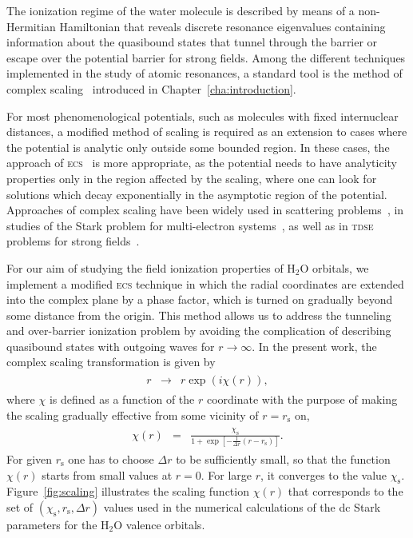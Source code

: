 The ionization regime of the water molecule is described by means of a
non-Hermitian Hamiltonian that reveals discrete resonance eigenvalues
containing information about the quasibound states that tunnel through
the barrier or escape over the potential barrier for strong
fields. Among the different techniques implemented in the study of
atomic resonances, a standard tool is the method of complex
scaling~\cite{complexScaling,complexScalingBaslev,complexScalingSimon}
introduced in Chapter~\ref{cha:introduction}.

For most phenomenological potentials, such as molecules with fixed
internuclear distances, a modified method of scaling is required as an
extension to cases where the potential is analytic only outside some
bounded region. In these cases, the approach of
\textsc{ecs}~\cite{Simon_1979} is more appropriate, as the potential
needs to have analyticity properties only in the region affected by
the scaling, where one can look for solutions which decay
exponentially in the asymptotic region of the potential. Approaches of
complex scaling have been widely used in scattering
problems~\cite{complexScalingBaslev, complexScalingSimon}, in studies
of the Stark problem for multi-electron
systems~\cite{ScrinziJChemPhys_ECS,ScrinziJPhysB_ECS}, as well as in
\textsc{tdse} problems for strong fields~\cite{ecsRuiz, ecsTao,
  ecsScrinzi}.

For our aim of studying the field ionization properties of H$_{2}$O
orbitals, we implement a modified \textsc{ecs} technique in which the
radial coordinates are extended into the complex plane by a phase
factor, which is turned on gradually beyond some distance from the
origin. This method allows us to address the tunneling and
over-barrier ionization problem by avoiding the complication of
describing quasibound states with outgoing waves for $r \to
\infty$. In the present work, the complex scaling transformation is
given by
%
\begin{eqnarray}
  \begin{split}
    r & \rightarrow & r\exp(i\chi(r)),
  \end{split}
\label{eq:ecs_r}
\end{eqnarray}
%
where $\chi$ is defined as a function of the $r$ coordinate with the
purpose of making the scaling gradually effective from some vicinity
of $r = r_{\mathrm{s}}$ on,
%
\begin{eqnarray}
  \begin{split}
    \chi(r) & = & \frac{\chi_{\mathrm{s}}}{1+\exp[-\frac{1}{\Delta r}
        (r - r_{\mathrm{s}})]}.
  \end{split}
\label{eq:ecs_theta}
\end{eqnarray} 
%
For given $r_{\mathrm{s}}$ one has to choose $\Delta r$ to be
sufficiently small, so that the function $\chi(r)$ starts from small
values at $r = 0$. For large $r$, it converges to the value
$\chi_{\mathrm{s}}$. Figure~\ref{fig:scaling} illustrates the scaling
function $\chi(r)$ that corresponds to the set of $(\chi_{\mathrm{s}},
r_{\mathrm{s}}, \Delta r)$ values used in the numerical calculations
of the dc Stark parameters for the H$_{2}$O valence orbitals.

